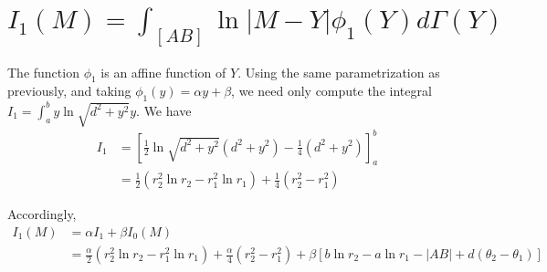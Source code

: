 \documentclass[11pt,a4paper]{article}
\begin{document}
\section{$I_1(M) = \displaystyle\int_{[AB]} {\ln|M - Y|\phi_1(Y)d\Gamma(Y)}$}

The function $\phi_1$ is an affine function of $Y$. Using the same parametrization as previously, and taking $\phi_1(y) =  \alpha y + \beta$, we need only compute the integral $I_{1} = \displaystyle \int_{a}^b y \ln \sqrt{d^2+ y^2}y$. 
We have
\begin{align*}
	I_1 &= \left[\frac{1}{2} \ln \sqrt{d^2 + y^2} (d^2 + y^2) - \frac{1}{4}(d^2 + y^2)\right]_a^b\\
	&=  \frac{1}{2} \left( r_2^2 \ln r_2  - r_1^2 \ln r_1\right)  + \frac{1}{4}\left(r_2^2 - r_1^2\right)
\end{align*}
	
Accordingly, 
\begin{align*}
	I_1(M) &= \alpha I_1 + \beta I_0(M)\\
	&=  \frac{\alpha}{2} \left( r_2^2 \ln r_2  - r_1^2 \ln r_1\right)  + \frac{\alpha}{4}\left(r_2^2 - r_1^2\right) + \beta\left[b \ln r_2 - a \ln{r_1} - |AB| + d (\theta_2 - \theta_1)\right]\\
\end{align*}
\end{document}
